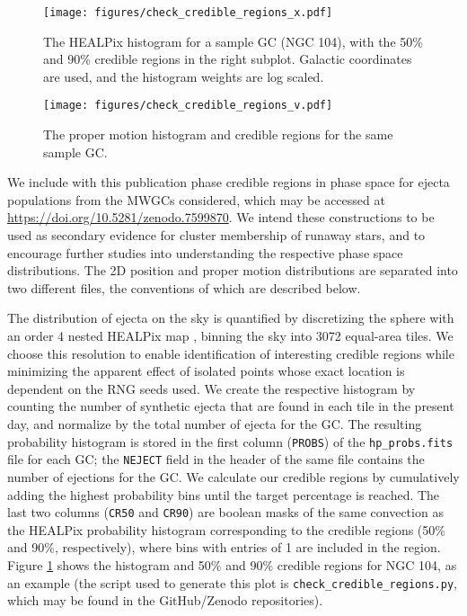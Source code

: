 \documentclass[twocolumn]{aastex631}
\begin{document}
\begin{figure}
    \centering
    \texttt{[image: figures/check\_credible\_regions\_x.pdf]}
    \caption{
        The HEALPix histogram for a sample GC (NGC 104), with the 50\% and 90\% credible regions in the right subplot.
        Galactic coordinates are used, and the histogram weights are log scaled.
    }
    \label{fig:check_credible_regions_x}
\end{figure}

\begin{figure}
    \centering
    \texttt{[image: figures/check\_credible\_regions\_v.pdf]}
    \caption{
        The proper motion histogram and credible regions for the same sample GC.
    }
    \label{fig:check_credible_regions_v}
\end{figure}

We include with this publication phase credible regions in phase space for ejecta populations from the MWGCs considered, which may be accessed at \url{https://doi.org/10.5281/zenodo.7599870}.
We intend these constructions to be used as secondary evidence for cluster membership of runaway stars, and to encourage further studies into understanding the respective phase space distributions.
The 2D position and proper motion distributions are separated into two different files, the conventions of which are described below.

The distribution of ejecta on the sky is quantified by discretizing the sphere with an order 4 nested HEALPix map \citep{2005ApJ...622..759G}, binning the sky into 3072 equal-area tiles.
We choose this resolution to enable identification of interesting credible regions while minimizing the apparent effect of isolated points whose exact location is dependent on the RNG seeds used.
We create the respective histogram by counting the number of synthetic ejecta that are found in each tile in the present day, and normalize by the total number of ejecta for the GC.
The resulting probability histogram is stored in the first column (\texttt{PROBS}) of the \texttt{hp\_probs.fits} file for each GC; the \texttt{NEJECT} field in the header of the same file contains the number of ejections for the GC.
We calculate our credible regions by cumulatively adding the highest probability bins until the target percentage is reached.
The last two columns (\texttt{CR50} and \texttt{CR90}) are boolean masks of the same convection as the HEALPix probability histogram corresponding to the credible regions (50\% and 90\%, respectively), where bins with entries of 1 are included in the region.
Figure \ref{fig:check_credible_regions_x} shows the histogram and 50\% and 90\% credible regions for NGC 104, as an example (the script used to generate this plot is \texttt{check\_credible\_regions.py}, which may be found in the GitHub/Zenodo repositories).
\end{document}
